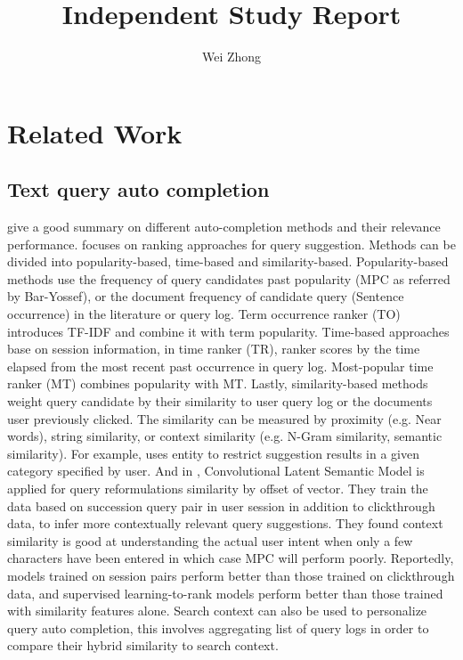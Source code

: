 \documentclass[12pt]{article} %
\begin{document}
\title{Independent Study Report}
\author{Wei Zhong}
\date{}

\maketitle

\section{Related Work}

\subsection{Text query auto completion}
\cite{cai_survey_2016}
\cite{di_santo_comparing_2015}
give a good summary on different auto-completion methods and their relevance
performance.
\cite{di_santo_comparing_2015} focuses on ranking approaches for query suggestion.
Methods can be divided into popularity-based, time-based and similarity-based.
Popularity-based methods use the frequency of query candidates past popularity (MPC as referred by Bar-Yossef), or the document frequency of candidate query (Sentence occurrence) in the literature or
query log. Term occurrence ranker (TO) introduces TF-IDF and combine it with term popularity.
Time-based approaches base on session information, in time ranker (TR), ranker scores by the time elapsed from the most recent past occurrence in query log. Most-popular time ranker (MT) combines popularity with MT.
Lastly, similarity-based methods weight query candidate by their similarity to user query log or the documents user previously clicked. The similarity can be measured by proximity (e.g. Near words), string similarity, or context similarity (e.g. N-Gram similarity, semantic similarity).
For example, \cite{schmidt_context_sensitive_2016} uses entity to restrict suggestion results in a given category specified by user. 
And in \cite{mitra_exploring_2015}, Convolutional Latent Semantic Model is applied for query reformulations similarity by offset of vector.
They train the data based on succession query pair in user session in addition to clickthrough data,
to infer more contextually relevant query suggestions.
They found context similarity is good at understanding the actual user intent when only a few characters have been entered in which case MPC will perform poorly.
Reportedly, models trained on session pairs perform better than those trained on clickthrough data, and supervised learning-to-rank models perform better than
those trained with similarity features alone.
Search context can also be used to personalize query auto completion, this involves aggregating list of query logs in order to compare their hybrid similarity to search context.
\end{document}
